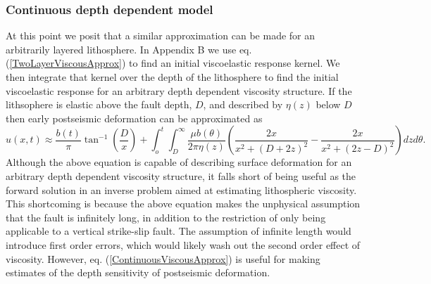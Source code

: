 \documentclass[extra]{gji}
\begin{document}
\subsubsection{Continuous depth dependent model}
At this point we posit that a similar approximation can be made for an
arbitrarily layered lithosphere. In Appendix B we use
eq. (\ref{TwoLayerViscousApprox}) to find an initial viscoelastic
response kernel.  We then integrate that kernel over the depth of the
lithosphere to find the initial viscoelastic response for an arbitrary
depth dependent viscosity structure.  If the lithsophere is elastic
above the fault depth, $D$, and described by $\eta(z)$ below $D$ then
early postseismic deformation can be approximated as
\begin{equation}\label{ContinuousViscousApprox}
u(x,t) \approx \frac{b(t)}{\pi}\tan^{-1}(\frac{D}{x}) + 
               \int_o^t\int_D^\infty \frac{\mu b(\theta)}{2\pi\eta(z)}
                                    \left(\frac{2x}{x^2 + \left(D + 2z\right)^2} - 
                                    \frac{2x}{x^2 + \left(2z - D\right)^2}\right)
                                    dz d\theta.
\end{equation}
Although the above equation is capable of describing surface
deformation for an arbitrary depth dependent viscosity structure, it
falls short of being useful as the forward solution in an inverse
problem aimed at estimating lithospheric viscosity.  This shortcoming
is because the above equation makes the unphysical assumption that the
fault is infinitely long, in addition to the restriction of only being
applicable to a vertical strike-slip fault.  The assumption of
infinite length would introduce first order errors, which would likely
wash out the second order effect of viscosity. However,
eq. (\ref{ContinuousViscousApprox}) is useful for making estimates of
the depth sensitivity of postseismic deformation.
\end{document}
